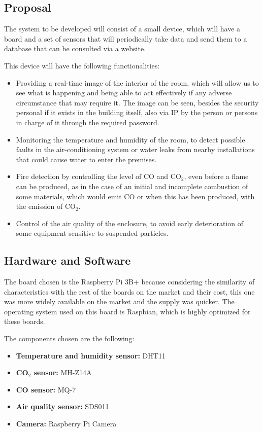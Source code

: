 \subsection{Proposal}\label{subsec:proposal}
The system to be developed will consist of a small device, which will have a board and a set of sensors that will periodically take data and send them to a database that can be consulted via a website.

This device will have the following functionalities:
\begin{itemize}
	\item Providing a real-time image of the interior of the room, which will allow us to see what is happening and being able to act effectively if any adverse circumstance that may require it. The image can be seen, besides the security personal if it exists in the building itself, also via IP by the person or persons in charge of it through the required password.
	\item Monitoring the temperature and humidity of the room, to detect possible faults in the air-conditioning system or water leaks from nearby installations that could cause water to enter the premises.
	\item Fire detection by controlling the level of CO and CO$_2$, even before a flame can be produced, as in the case of an initial and incomplete combustion of some materials, which would emit CO or when this has been produced, with the emission of CO$_2$.
	\item Control of the air quality of the enclosure, to avoid early deterioration of some equipment sensitive to suspended particles.
\end{itemize}

\subsection{Hardware and Software}\label{subsec:hardware-and-software}
The board chosen is the Raspberry Pi 3B+ because considering the similarity of characteristics with the rest of the boards on the market and their cost, this one was more widely available on the market and the supply was quicker. The operating system used on this board is Raspbian, which is highly optimized for these boards.

The components chosen are the following:
\begin{itemize}
	\item \textbf{Temperature and humidity sensor:} DHT11
	\item \textbf{CO$_2$ sensor:} MH-Z14A
	\item \textbf{CO sensor:} MQ-7
	\item \textbf{Air quality sensor:} SDS011
	\item \textbf{Camera:} Raspberry Pi Camera
\end{itemize}

